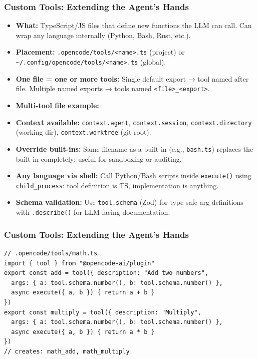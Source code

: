 \begin{frame}[fragile]\frametitle{Custom Tools:  Extending the Agent's Hands}
  \begin{itemize}
    \item \textbf{What:} TypeScript/JS files that define new functions the LLM can call. Can wrap any language internally (Python, Bash, Rust, etc.).
    \item \textbf{Placement:} \texttt{.opencode/tools/<name>.ts} (project) or \texttt{\textasciitilde/.config/opencode/tools/<name>.ts} (global).
    \item \textbf{One file = one or more tools:} Single default export → tool named after file. Multiple named exports → tools named \texttt{<file>\_<export>}.
    \item \textbf{Multi-tool file example:}
    \item \textbf{Context available:} \texttt{context.agent}, \texttt{context.session}, \texttt{context.directory} (working dir), \texttt{context.worktree} (git root).
    \item \textbf{Override built-ins:} Same filename as a built-in (e.g., \texttt{bash.ts}) replaces the built-in completely:  useful for sandboxing or auditing.
    \item \textbf{Any language via shell:} Call Python/Bash scripts inside \texttt{execute()} using \texttt{child\_process}:  tool definition is TS, implementation is anything.
    \item \textbf{Schema validation:} Use \texttt{tool.schema} (Zod) for type-safe arg definitions with \texttt{.describe()} for LLM-facing documentation.
  \end{itemize}

\end{frame}



\begin{frame}[fragile]\frametitle{Custom Tools:  Extending the Agent's Hands}

\begin{lstlisting}
// .opencode/tools/math.ts
import { tool } from "@opencode-ai/plugin"
export const add = tool({ description: "Add two numbers",
  args: { a: tool.schema.number(), b: tool.schema.number() },
  async execute({ a, b }) { return a + b }
})
export const multiply = tool({ description: "Multiply",
  args: { a: tool.schema.number(), b: tool.schema.number() },
  async execute({ a, b }) { return a * b }
})
// creates: math_add, math_multiply
\end{lstlisting}  
\end{frame}


